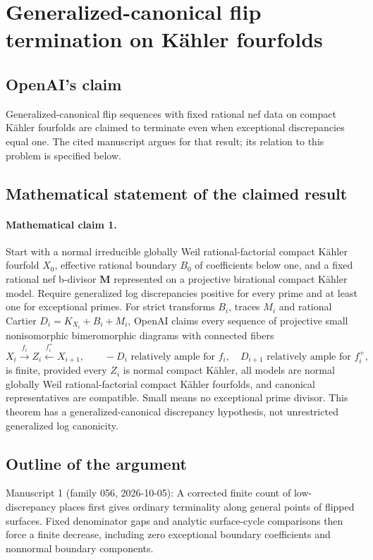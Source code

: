 \documentclass[11pt]{article}
\begin{document}
\section*{Generalized-canonical flip termination on Kähler fourfolds}

\subsection{OpenAI's claim}
Generalized-canonical flip sequences with fixed rational nef data on compact Kähler fourfolds are claimed to terminate even when exceptional discrepancies equal one. The cited manuscript argues for that result; its relation to this problem is specified below.

\subsection{Mathematical statement of the claimed result}
\paragraph{Mathematical claim 1.} Start with a normal irreducible globally Weil rational-factorial compact Kähler fourfold $X_0$, effective rational boundary $B_0$ of coefficients below one, and a fixed rational nef b-divisor $\mathbf M$ represented on a projective birational compact Kähler model. Require generalized log discrepancies positive for every prime and at least one for exceptional primes. For strict transforms $B_i$, traces $M_i$ and rational Cartier $D_i=K_{X_i}+B_i+M_i$, OpenAI claims every sequence of projective small nonisomorphic bimeromorphic diagrams with connected fibers
\[
X_i\xrightarrow{f_i}Z_i\xleftarrow{f_i^+}X_{i+1},\qquad
-D_i\text{ relatively ample for }f_i,\quad D_{i+1}\text{ relatively ample for }f_i^+,
\]
is finite, provided every $Z_i$ is normal compact Kähler, all models are normal globally Weil rational-factorial compact Kähler fourfolds, and canonical representatives are compatible. Small means no exceptional prime divisor. This theorem has a generalized-canonical discrepancy hypothesis, not unrestricted generalized log canonicity.

\subsection{Outline of the argument}
Manuscript 1 (family 056, 2026-10-05): A corrected finite count of low-discrepancy places first gives ordinary terminality along general points of flipped surfaces. Fixed denominator gaps and analytic surface-cycle comparisons then force a finite decrease, including zero exceptional boundary coefficients and nonnormal boundary components.
\end{document}
